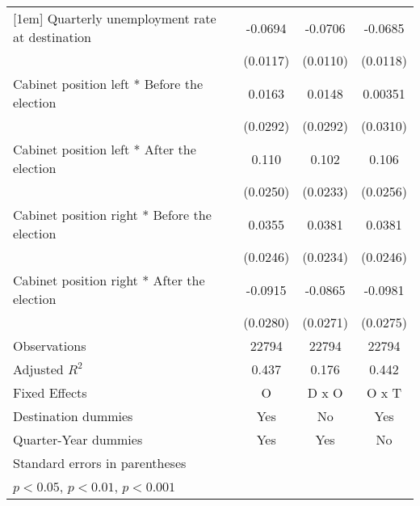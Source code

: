 \begin{table}[htbp]
\begin{tabular}{l*{3}{c}}
[1em]
Quarterly unemployment rate at destination&     -0.0694\sym{***}&     -0.0706\sym{***}&     -0.0685\sym{***}\\
                    &    (0.0117)         &    (0.0110)         &    (0.0118)         \\
[1em]
Cabinet position left * Before the election&      0.0163         &      0.0148         &     0.00351         \\
                    &    (0.0292)         &    (0.0292)         &    (0.0310)         \\
[1em]
Cabinet position left * After the election&       0.110\sym{***}&       0.102\sym{***}&       0.106\sym{***}\\
                    &    (0.0250)         &    (0.0233)         &    (0.0256)         \\
[1em]
Cabinet position right * Before the election&      0.0355         &      0.0381         &      0.0381         \\
                    &    (0.0246)         &    (0.0234)         &    (0.0246)         \\
[1em]
Cabinet position right * After the election&     -0.0915\sym{**} &     -0.0865\sym{**} &     -0.0981\sym{***}\\
                    &    (0.0280)         &    (0.0271)         &    (0.0275)         \\
\hline
Observations        &       22794         &       22794         &       22794         \\
Adjusted \(R^{2}\)  &       0.437         &       0.176         &       0.442         \\
Fixed Effects       &           O         &       D x O         &       O x T         \\
Destination dummies &         Yes         &          No         &         Yes         \\
Quarter-Year dummies&         Yes         &         Yes         &          No         \\
\hline\hline
\multicolumn{4}{l}{\footnotesize Standard errors in parentheses}\\
\multicolumn{4}{l}{\footnotesize \sym{*} \(p<0.05\), \sym{**} \(p<0.01\), \sym{***} \(p<0.001\)}\\
\end{tabular}
\end{table}
